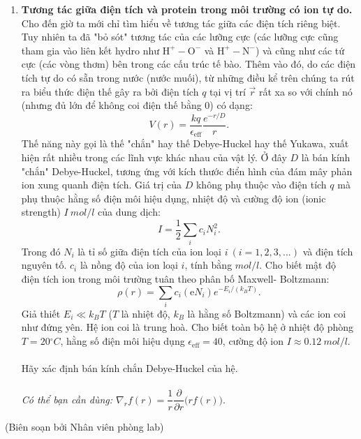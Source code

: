 \begin{enumerate}
    \item \textbf{Tương tác giữa điện tích và protein trong môi trường có ion tự do.} \\ 
    Cho đến giờ ta mới chỉ tìm hiểu về tương tác giữa các điện tích riêng biệt. Tuy nhiên ta đã "bỏ sót" tương tác của các lưỡng cực (các lưỡng cực cũng tham gia vào liên kết hydro như $\text{H}^+ - \text{O}^-$ và $\text{H}^+ - \text{N}^-$) và cũng như các tứ cực (các vòng thơm) bên trong các cấu trúc tế bào. Thêm vào đó, do các điện tích tự do có sẵn trong nước (nước muối), từ những điều kể trên chúng ta rút ra biểu thức điện thế gây ra bởi điện tích $q$ tại vị trí $\Vec{r}$ rất xa so với chính nó (nhưng đủ lớn để không coi điện thế bằng $0$) có dạng: $$V(r)=\dfrac{kq}{\epsilon_{\text{eff}}}\dfrac{e^{-r/D}}{r}.$$Thế năng này gọi là thế "chắn" hay thế Debye-Huckel hay thế Yukawa, xuất hiện rất nhiều trong các lĩnh vực khác nhau của vật lý. Ở đây $D$ là bán kính "chắn" Debye-Huckel, tương ứng với kích thước điển hình của đám mây phản ion xung quanh điện tích. Giá trị của $D$ không phụ thuộc vào điện tích $q$ mà phụ thuộc hằng số điện môi hiệu dụng, nhiệt độ và cường độ ion (ionic strength) $I\ \si{mol/l}$ của dung dịch: $$I=\dfrac{1}{2}\sum\limits_i {{c_i}N_i^2}. $$ Trong đó $N_i$ là tỉ số giữa điện tích của ion loại $i\ (i=1,2,3,...)$ và điện tích nguyên tố. $c_i$ là nồng độ của ion loại $i$, tính bằng $\si{mol/l}$. Cho biết mật độ điện tích ion trong môi trường tuân theo phân bố Maxwell- Boltzmann: $$\rho(r)=\sum\limits_i {{c_i}\left( {\text{e}{N_i}} \right)} {e^{ - E_i/(k_BT)}}.$$ Giả thiết $E_i \ll k_BT$ ($T$ là nhiệt độ, $k_B$ là hằng số Boltzmann) và các ion coi như đứng yên. Hệ ion coi là trung hoà. Cho biết toàn bộ hệ ở nhiệt độ phòng $T=20 \si{^\circ C}$, hằng số điện môi hiệu dụng $\epsilon_{\text{eff}}=40$, cường độ ion $I \approx 0.12\ \si{mol/l}$. \\ \\
    Hãy xác định bán kính chắn Debye-Huckel của hệ.\\ \\
\textit{Có thể bạn cần dùng: $\nabla_r f(r)=\dfrac{1}{r}\dfrac{\partial}{\partial r}\Big(rf(r)\Big).$}


    
\end{enumerate}
\begin{flushright}
    (Biên soạn bởi Nhân viên phòng lab)
\end{flushright}